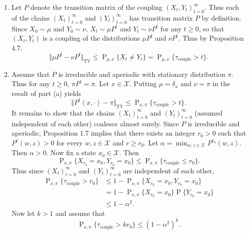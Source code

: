 \documentclass[12pt]{article}
\DeclareMathOperator{\Prob}{P}
\begin{document}
\begin{enumerate}[label=(\alph*)]
\item
Let $P$ denote the transition matrix of the coupling $(X_t, Y_t)_{t=0}^\infty$. Thus each of the chains $(X_t)_{t=0}^\infty$ and $(Y_t)_{t=0}^\infty$ has transition matrix $P$ by definition. Since $X_0 \sim \mu$ and $Y_0 \sim \nu$, $X_t \sim \mu P^t$ and $Y_t \sim \nu P^t$ for any $t \geq 0$, so that $(X_t, Y_t)$ is a coupling of the distributions $\mu P^t$ and $\nu P^t$. Thus by Proposition 4.7,
\begin{equation*}
\Vert \mu P^t - \nu P^t \Vert_\mathrm{TV} \leq \Prob_{\mu, \nu}\{X_t \neq Y_t\} = \Prob_{\mu, \nu}\{\tau_\mathrm{couple} > t\}.
\end{equation*}

\item
Assume that $P$ is irreducible and aperiodic with stationary distribution $\pi$. Thus for any $t \geq 0$, $\pi P^t = \pi$. Let $x \in \mathcal{X}$. Putting $\mu = \delta_x$ and $\nu = \pi$ in the result of part (a) yields
\begin{equation*}
\Vert P^t(x, \cdot) - \pi \Vert_\mathrm{TV} \leq \Prob_{x, \pi}\{\tau_\mathrm{couple} > t\}.
\end{equation*}
It remains to show that the chains $(X_t)_{t=0}^\infty$ and $(Y_t)_{t=0}^\infty$ (assumed independent of each other) coalesce almost surely. Since $P$ is irreducible and aperiodic, Proposition 1.7 implies that there exists an integer $r_0 > 0$ such that $P^r(w, z) > 0$ for every $w, z \in \mathcal{X}$ and $r \geq r_0$. Let $\alpha = \min_{w, z \in \mathcal{X}} P^{r_0}(w, z)$. Then $\alpha > 0$. Now fix a state $x_0 \in \mathcal{X}$. Then
\begin{equation*}
\Prob_{x, \pi}\{X_{r_0} = x_0, Y_{r_0} = x_0\} \leq \Prob_{x, \pi}\{\tau_\mathrm{couple} \leq r_0\}.
\end{equation*}
Thus since $(X_t)_{t=0}^\infty$ and $(Y_t)_{t=0}^\infty$ are independent of each other,
\begin{align*}
\Prob_{x, \pi}\{\tau_\mathrm{couple} > r_0\} &\leq 1 - \Prob_{x, \pi}\{X_{r_0} = x_0, Y_{r_0} = x_0\} \\
&= 1 - \Prob_{x, \pi}\{X_{r_0} = x_0\} \Prob\{Y_{r_0} = x_0\} \\
&\leq 1 - \alpha^2.
\end{align*}
Now let $k > 1$ and assume that
\begin{equation} \label{eq:1}
\Prob_{x, \pi}\{\tau_\mathrm{couple} > kr_0\} \leq (1 - \alpha^2)^k.
\end{equation}

\end{enumerate}
\end{document}
